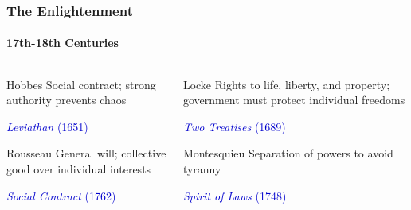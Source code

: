 \documentclass[10pt]{beamer}
\begin{document}
\begin{frame}
\frametitle{The Enlightenment}
\framesubtitle{17th-18th Centuries}

\begin{columns}
\begin{column}{0.48\textwidth}
\begin{block}{Hobbes}
\pause
Social contract; strong authority prevents chaos

\vspace{0.2cm}
\textcolor{mediumblue}{\textit{Leviathan} (1651)}
\end{block}

\vspace{0.3cm}

\begin{block}{Rousseau}
\pause
General will; collective good over individual interests

\vspace{0.2cm}
\textcolor{mediumblue}{\textit{Social Contract} (1762)}
\end{block}
\end{column}

\begin{column}{0.48\textwidth}
\begin{block}{Locke}
\pause
Rights to life, liberty, and property; government must protect individual freedoms

\vspace{0.2cm}
\textcolor{mediumblue}{\textit{Two Treatises} (1689)}
\end{block}

\vspace{0.3cm}

\begin{block}{Montesquieu}
\pause
Separation of powers to avoid tyranny

\vspace{0.2cm}
\textcolor{mediumblue}{\textit{Spirit of Laws} (1748)}
\end{block}
\end{column}
\end{columns}

\end{frame}
\end{document}
